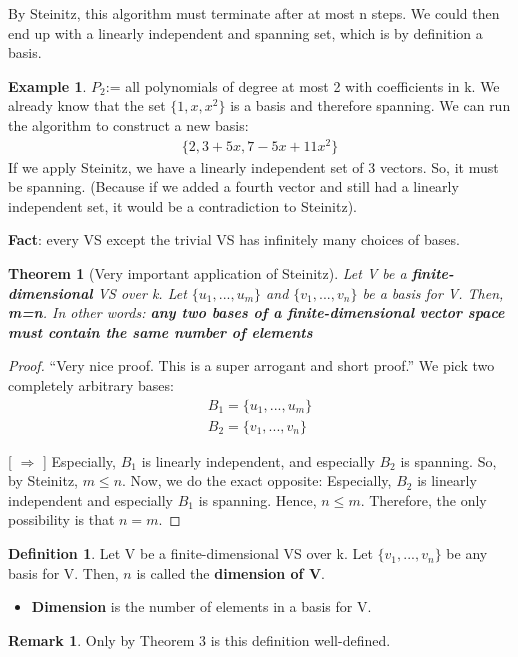 \documentclass[a4paper, 12pt]{article}
\newtheorem{theorem}{Theorem}
\theoremstyle{definition}
\newtheorem{exmp}{Example}[section]
\theoremstyle{definition}
\newtheorem{defn}{Definition}[section]
\theoremstyle{definition}
\theoremstyle{definition}
\newtheorem{rmk}{Remark}[section]
\begin{document}
{\begin{center}
\end{center}  
 


By Steinitz, this algorithm must terminate after at most n steps. We could then end up with a linearly independent and spanning set, which is by definition a basis. 

\begin{exmp}
	$P_2$:= all polynomials of degree at most 2 with coefficients in k. We already know that the set $\{ 1, x, x^2 \}$ is a basis and therefore spanning. We can run the algorithm to construct a new basis: 
	\begin{align*}
		\{ 2, 3 + 5x, 7-5x + 11x^2 \} 
	\end{align*}
	If we apply Steinitz, we have a linearly independent set of 3 vectors. So, it must be spanning. (Because if we added a fourth vector and still had a linearly independent set, it would be a contradiction to Steinitz). 
\end{exmp}

\textbf{Fact}: every VS except the trivial VS has infinitely many choices of bases. 

\begin{theorem}[Very important application of Steinitz] 
	Let V be a \textbf{finite-dimensional} VS over k. Let $ \{ u_1,...,u_m \}$ and $ \{ v_1, ..., v_n \}$ be a basis for V. Then, \textbf{m=n}. In other words: \textbf{any two bases of a finite-dimensional vector space must contain the same number of elements}
\end{theorem}
\begin{proof}
	``Very nice proof. This is a super arrogant and short proof.'' We pick two completely arbitrary bases: 
	\begin{align*}
		B_1 = \{ u_1, ..., u_m \} \\
		B_2 = \{ v_1, ..., v_n \} 
	\end{align*}

	[ $\Rightarrow$ ] Especially, $B_1$ is linearly independent, and especially $B_2$ is spanning. So, by Steinitz, $m \leq n$. Now, we do the exact opposite: 
	\newline 
	[ $\Leftarrow$ ] Especially, $B_2$ is linearly independent and especially $B_1$ is spanning. Hence, $n \leq m$. Therefore, the only possibility is that $n = m$. 
\end{proof}

\begin{defn}
	Let V be a finite-dimensional VS over k. Let $ \{v_1, ..., v_n \}$ be any basis for V. Then, $n$ is called the \textbf{dimension of V}. 
	\begin{itemize}
		\item \textbf{Dimension} is the number of elements in a basis for V. 
	\end{itemize}
	\begin{rmk}
		Only by Theorem 3 is this definition well-defined. 
	\end{rmk}
\end{defn}

}
\end{document}
